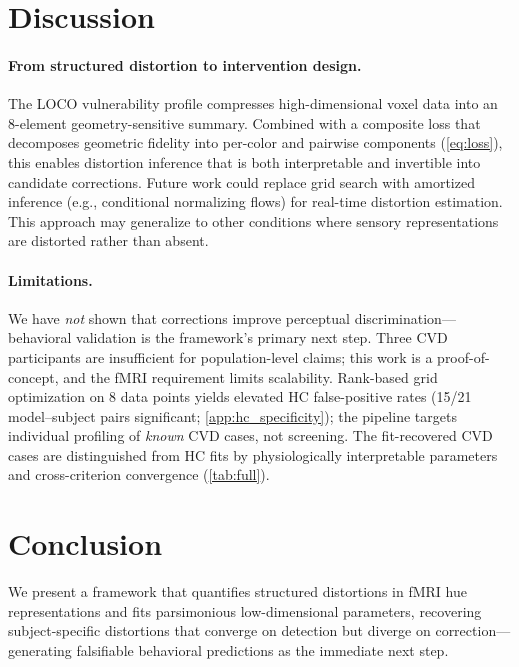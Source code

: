 \documentclass{article}
\begin{document}
\section{Discussion}
\label{sec:discussion}

\paragraph{From structured distortion to intervention design.}
The LOCO vulnerability profile compresses high-dimensional voxel data into an 8-element geometry-sensitive summary.
Combined with a composite loss that decomposes geometric fidelity into per-color and pairwise components (\cref{eq:loss}), this enables distortion inference that is both interpretable and invertible into candidate corrections.
Future work could replace grid search with amortized inference (e.g., conditional normalizing flows) for real-time distortion estimation.
This approach may generalize to other conditions where sensory representations are distorted rather than absent.

\paragraph{Limitations.}
We have \emph{not} shown that corrections improve perceptual discrimination---behavioral validation is the framework's primary next step.
Three CVD participants are insufficient for population-level claims; this work is a proof-of-concept, and the fMRI requirement limits scalability.
Rank-based grid optimization on 8 data points yields elevated HC false-positive rates (15/21 model--subject pairs significant; \cref{app:hc_specificity}); the pipeline targets individual profiling of \emph{known} CVD cases, not screening.
The fit-recovered CVD cases are distinguished from HC fits by physiologically interpretable parameters and cross-criterion convergence (\cref{tab:full}).


\section{Conclusion}
\label{sec:conclusion}

We present a framework that quantifies structured distortions in fMRI hue representations and fits parsimonious low-dimensional parameters, recovering subject-specific distortions that converge on detection but diverge on correction---generating falsifiable behavioral predictions as the immediate next step.
\end{document}
